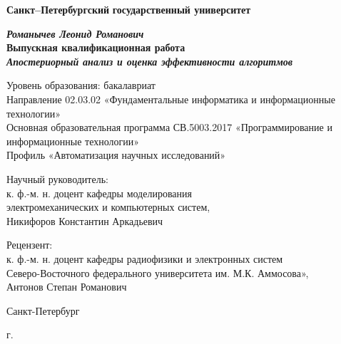 
\begin{titlepage}
\begin{center}
\textbf{Санкт--Петербургский}
\textbf{государственный университет}

\vspace{35mm}

\textbf{\textit{\large Романычев Леонид Романович}} \\[8mm]
\textbf{\large Выпускная квалификационная работа}\\[3mm]
\textbf{\textit{\large Апостериорный анализ и оценка эффективности алгоритмов}}

\vspace{20mm}
Уровень образования: бакалавриат\\
Направление 02.03.02 «Фундаментальные информатика и информационные технологии»\\
Основная образовательная программа СВ.5003.2017
«Программирование и информационные технологии»\\
Профиль «Автоматизация научных исследований»\\[30mm]


\begin{flushright}
{Научный руководитель:} \\
к. ф.-м. н. доцент кафедры моделирования\\
электромеханических и компьютерных систем,\\
Никифоров Константин Аркадьевич
\end{flushright}
\begin{flushright}
{Рецензент:} \\
к. ф.-м. н. доцент кафедры радиофизики и электронных систем\\
Северо-Восточного федерального университета им. М.К. Аммосова»,\\
Антонов Степан Романович
\end{flushright}

\vfill 

{Санкт-Петербург}
\par{\the\year{} г.}
\end{center}
\end{titlepage}
\restoregeometry
\addtocounter{page}{1}
